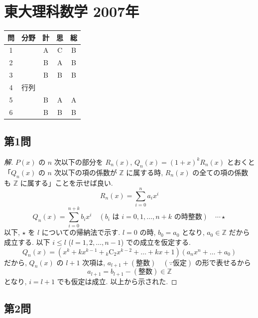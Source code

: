 \documentclass[../main.tex]{subfiles}
\begin{document}
\section*{東大理科数学 2007年}

\begin{center}
  \begin{tabular}{|c|c|c|c|c|}
    \hline
    問 & 分野 & 計 & 思 & 総 \\ \hline
    1 & & A & C & B \\ \hline
    2 & & B & A & B \\ \hline
    3 & & B & B & B \\ \hline
    4 & 行列 & & & \\ \hline
    5 & & B & A & A \\ \hline
    6 & & B & B & B \\ \hline
  \end{tabular}
\end{center}

\bigskip

\subsection*{第1問}

\begin{proof}[解]
  $P(x)$ の $n$ 次以下の部分を $R_n(x)$, $Q_n(x) = (1+x)^k R_n(x)$ とおくと
  「$Q_n(x)$ の $n$ 次以下の項の係数が $\mathbb{Z}$ に属する時, $R_n(x)$ の全ての項の係数も $\mathbb{Z}$ に属する」ことを示せば良い.
  \[
    R_n(x) = \sum_{i=0}^n a_i x^i
  \]
  \[
    Q_n(x) = \sum_{i=0}^{n+k} b_i x^i \quad (b_i \text{ は } i=0,1,\dots,n+k \text{ の時整数}) \quad \cdots \star
  \]
  以下, $\star$ を $l$ についての帰納法で示す. $l=0$ の時,
  $b_0 = a_0$ となり, $a_0 \in \mathbb{Z}$ だから成立する. 以下 $i \le l$ ($l=1,2,\dots,n-1$) での成立を仮定する.
  \[
    Q_n(x) = \left( x^k + k x^{k-1} + {}_k\mathrm{C}_2 x^{k-2} + \dots + kx + 1 \right) (a_n x^n + \dots + a_0)
  \]
  だから, $Q_n(x)$ の $l+1$ 次項は, $a_{l+1} + (\text{整数}) \quad (\because \text{仮定})$ の形で表せるから
  \[
    a_{l+1} = b_{l+1} - (\text{整数}) \in \mathbb{Z}
  \]
  となり, $i=l+1$ でも仮定は成立. 以上から示された. \quad \text{//}
\end{proof}

\subsection*{第2問}
\end{document}
